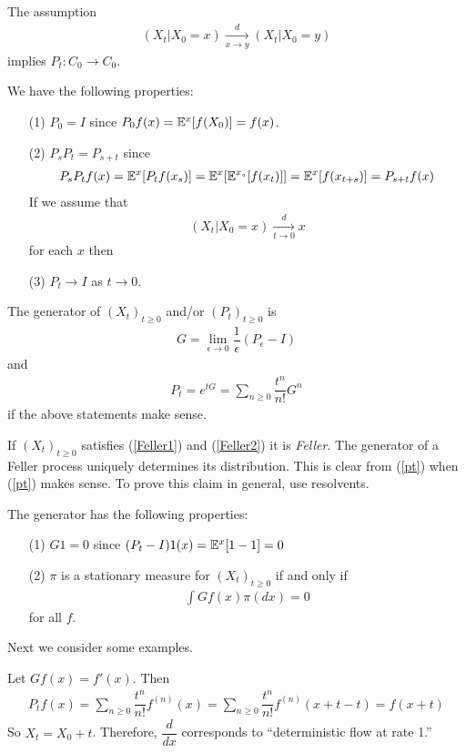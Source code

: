 \documentclass[classnotes]{fillsntsx}
\begin{document}
\begin{note}
The assumption
\begin{align}
\label{Feller1}
(X_t | X_0 = x) \xrightarrow[x \to y]{d} (X_t | X_0 =y) 
\end{align}
implies $P_t: C_0 \to C_0$.
\end{note}

We have the following properties: 
\begin{enumerate}
\item[(1)] $P_0 = I$ since $P_0 f(x) = \mathbb{E}^{x} [f(X_0)] = f(x)$. 
\item[(2)] $P_s P_t = P_{s + t}$
since
$$\begin{aligned}
P_s P_t f(x) = \mathbb{E}^{x}[P_t f(x_s) ] = \mathbb{E}^{x} [ \mathbb{E}^{x_s} [ f(x_t) ] ] 
= \mathbb{E}^{x} [ f(x_{t+s})]  
=  P_{s+t} f(x)
\end{aligned}$$
If we assume that
\begin{align}
\label{Feller2}
(X_t | X_0 = x) \xrightarrow[t \to 0]{d} x
\end{align}
for each $x$ then
\item[(3)] $P_t \to I$ as $t \to 0$. 
\end{enumerate}

\begin{defn}
The generator of $(X_t)_{t \geq 0}$ and/or $(P_t)_{t \geq 0}$ is
$$\begin{aligned}
G = \lim_{\epsilon \to 0} \dfrac{1}{\epsilon} (P_{\epsilon} - I)
\end{aligned}$$
and 
\begin{align}
\label{pt}
P_t = e^{tG} = \sum_{n \geq 0} \dfrac{t^{n}}{n!} G^n
\end{align}
if the above statements make sense. 
\end{defn}

\begin{note}
If $(X_t)_{t \geq 0}$ satisfies (\ref{Feller1}) and (\ref{Feller2}) it is {\em Feller}.
The generator of a Feller process uniquely determines its distribution. This is clear from (\ref{pt})
when (\ref{pt}) makes sense. To prove this claim in general, use resolvents. 
\end{note}
The generator has the following properties:
\begin{enumerate}
\item[(1)] $G1 = 0$ since $(P_t - I)1(x) = \mathbb{E}^{x}[1 - 1] = 0$
\item[(2)] $\pi$ is a stationary measure for $(X_t)_{t \geq 0}$ if and only if 
$$\begin{aligned}
\int G f(x) \pi (dx) = 0
\end{aligned}$$
for all $f$. 
\end{enumerate}
Next we consider some examples. 
\begin{exmp}
Let $Gf(x) = f'(x)$. Then 
$$\begin{aligned}
P_t f(x) =  \sum_{n \geq 0} \dfrac{t^{n}}{n!} f^{(n)}(x) =  \sum_{n \geq 0} \dfrac{t^{n}}{n!} f^{(n)}(x + t - t) =  f(x+t)
\end{aligned}$$
So $X_t = X_0 + t$. Therefore, $\dfrac{d}{dx}$ corresponds to ``deterministic flow at rate 1.''
\end{exmp}
\end{document}

